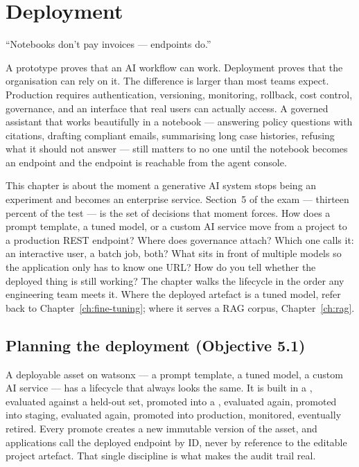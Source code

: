 \chapter{Deployment}
\label{ch:deployment}

\epigraph{``Notebooks don't pay invoices --- endpoints do.''}{}

A prototype proves that an AI workflow can work. Deployment proves that the organisation can rely on it. The difference is larger than most teams expect. Production requires authentication, versioning, monitoring, rollback, cost control, governance, and an interface that real users can actually access. A governed assistant that works beautifully in a notebook --- answering policy questions with citations, drafting compliant emails, summarising long case histories, refusing what it should not answer --- still matters to no one until the notebook becomes an endpoint and the endpoint is reachable from the agent console.

This chapter is about the moment a generative AI system stops being an experiment and becomes an enterprise service. Section~5 of the exam --- thirteen percent of the test --- is the set of decisions that moment forces. How does a prompt template, a tuned model, or a custom AI service move from a project to a production REST endpoint? Where does governance attach? Which one calls it: an interactive user, a batch job, both? What sits in front of multiple models so the application only has to know one URL? How do you tell whether the deployed thing is still working? The chapter walks the lifecycle in the order any engineering team meets it. Where the deployed artefact is a tuned model, refer back to Chapter~\ref{ch:fine-tuning}; where it serves a RAG corpus, Chapter~\ref{ch:rag}.

\section{Planning the deployment (Objective 5.1)}

A deployable asset on watsonx --- a prompt template, a tuned model, a custom AI service --- has a lifecycle that always looks the same. It is built in a , evaluated against a held-out set, promoted into a , evaluated again, promoted into staging, evaluated again, promoted into production, monitored, eventually retired. Every promote creates a new immutable version of the asset, and applications call the deployed endpoint by ID, never by reference to the editable project artefact. That single discipline is what makes the audit trail real.

